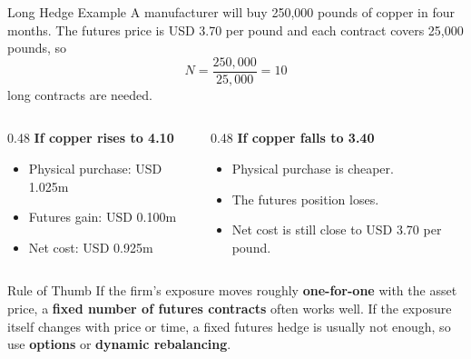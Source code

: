 \documentclass[aspectratio=169,11pt]{beamer}
\begin{document}
\begin{frame}{Long Hedge Example}
    \small
    A manufacturer will buy 250,000 pounds of copper in four months.
    The futures price is USD 3.70 per pound and each contract covers 25,000 pounds, so
    \[
        N=\frac{250{,}000}{25{,}000}=10
    \]
    long contracts are needed.

    \begin{columns}[T]
        \begin{column}{0.48\textwidth}
            \textbf{If copper rises to 4.10}
            \begin{itemize}
                \item Physical purchase: USD 1.025m
                \item Futures gain: USD 0.100m
                \item Net cost: USD 0.925m
            \end{itemize}
        \end{column}
        \begin{column}{0.48\textwidth}
            \textbf{If copper falls to 3.40}
            \begin{itemize}
                \item Physical purchase is cheaper.
                \item The futures position loses.
                \item Net cost is still close to USD 3.70 per pound.
            \end{itemize}
        \end{column}
    \end{columns}

    \begin{block}{Rule of Thumb}
        If the firm's exposure moves roughly \textbf{one-for-one} with the asset price,
        a \textbf{fixed number of futures contracts} often works well.
        If the exposure itself changes with price or time, a fixed futures hedge is
        usually not enough, so use \textbf{options} or \textbf{dynamic rebalancing}.
    \end{block}
\end{frame}
\end{document}
